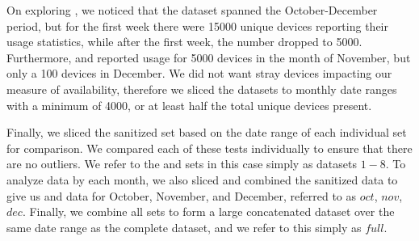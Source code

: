 On exploring , we noticed that the dataset spanned the October-December period, but for the first week there were 15000 unique devices reporting their usage statistics, while after the first week, the number dropped to 5000. Furthermore,  and  reported usage for 5000 devices in the month of November, but only a 100 devices in December. We did not want stray devices impacting our measure of availability, therefore we sliced the \control datasets to monthly date ranges with a minimum of 4000, or at least half the total unique devices present.

Finally, we sliced the sanitized \test set based on the date range of each individual \control set for comparison. We compared each of these tests individually to ensure that there are no outliers. We refer to the \test and \control sets in this case simply as datasets $1-8$. To analyze data by each month, we also sliced and combined the sanitized data to give us \control and \test data for October, November, and December, referred to as $oct$, $nov$, $dec$. Finally, we combine all \control sets to form a large concatenated dataset over the same date range as the complete \test dataset, and we refer to this simply as $full$. %

